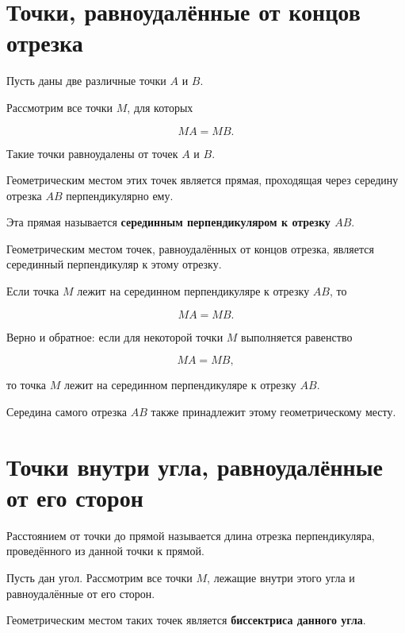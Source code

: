 	\section{Точки, равноудалённые от концов отрезка}
	
	Пусть даны две различные точки \(A\) и \(B\).
	
	Рассмотрим все точки \(M\), для которых
	
	\[
	MA=MB.
	\]
	
		Такие точки равноудалены от точек \(A\) и \(B\).
	
	Геометрическим местом этих точек является прямая, проходящая через середину
	отрезка \(AB\) перпендикулярно ему.
	
	Эта прямая называется \textbf{серединным перпендикуляром к отрезку \(AB\)}.

	\gmtperpendicularbisectorfigure

	\begin{propertybox}
		Геометрическим местом точек, равноудалённых от концов отрезка,
		является серединный перпендикуляр к этому отрезку.
	\end{propertybox}
	
	Если точка \(M\) лежит на серединном перпендикуляре к отрезку \(AB\), то
	
	\[
	MA=MB.
	\]
	
	Верно и обратное: если для некоторой точки \(M\) выполняется равенство
	
	\[
	MA=MB,
	\]
	
	то точка \(M\) лежит на серединном перпендикуляре к отрезку \(AB\).
	
	Середина самого отрезка \(AB\) также принадлежит этому геометрическому месту.
	
	\section{Точки внутри угла, равноудалённые от его сторон}
	
	\begin{notebox}[Напомним]
			Расстоянием от точки до прямой называется длина отрезка перпендикуляра,
			проведённого из данной точки к прямой.
	\end{notebox}

	\gmtdistancetolinefigure

		Пусть дан угол. Рассмотрим все точки \(M\), лежащие внутри этого угла
		и равноудалённые от его сторон.
		
		Геометрическим местом таких точек является \textbf{биссектриса данного угла}.

